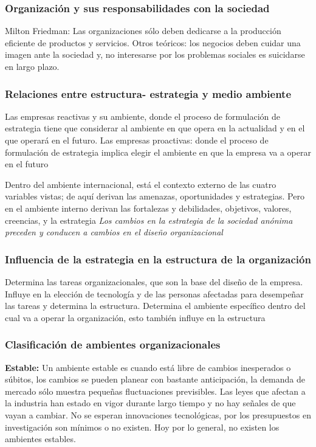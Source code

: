 \subsubsection{Organización y sus responsabilidades con la sociedad}
Milton Friedman: Las organizaciones sólo deben dedicarse a la producción eficiente de productos y servicios. Otros teóricos: los negocios deben cuidar una imagen ante la sociedad y, no interesarse por los problemas sociales es suicidarse en largo plazo.
\subsubsection{Relaciones entre estructura- estrategia y medio ambiente}
Las empresas reactivas y su ambiente, donde el proceso de formulación de estrategia tiene que considerar al ambiente en que opera en la actualidad y en el que operará en el futuro. Las empresas proactivas: donde el proceso de formulación de estrategia implica elegir el ambiente en que la empresa va a operar en el futuro

Dentro del ambiente internacional, está el contexto externo de las cuatro variables vistas; de aquí derivan las amenazas, oportunidades y estrategias. Pero en el ambiente interno derivan las fortalezas y debilidades, objetivos, valores, creencias, y la estrategia
\emph{Los cambios en la estrategia de la sociedad anónima preceden y conducen a cambios en el diseño organizacional\cite{chandler1962strategy}}
\subsubsection{Influencia de la estrategia en la estructura de la organización}
Determina las tareas organizacionales, que son la base del diseño de la empresa. Influye en la elección de tecnología y de las personas afectadas para desempeñar las tareas y determina la estructura. Determina el ambiente específico dentro del cual va a operar la organización, esto también influye en la estructura
\subsubsection{Clasificación de ambientes organizacionales}
\textbf{Estable:} Un ambiente estable es cuando está libre de cambios inesperados o súbitos, los cambios se pueden planear con bastante anticipación, la demanda de mercado sólo muestra pequeñas fluctuaciones previsibles. Las leyes que afectan a la industria han estado en vigor durante largo tiempo y no hay señales de que vayan a cambiar. No se esperan innovaciones tecnológicas, por los presupuestos en investigación son mínimos o no existen. Hoy por lo general, no existen los ambientes estables.

